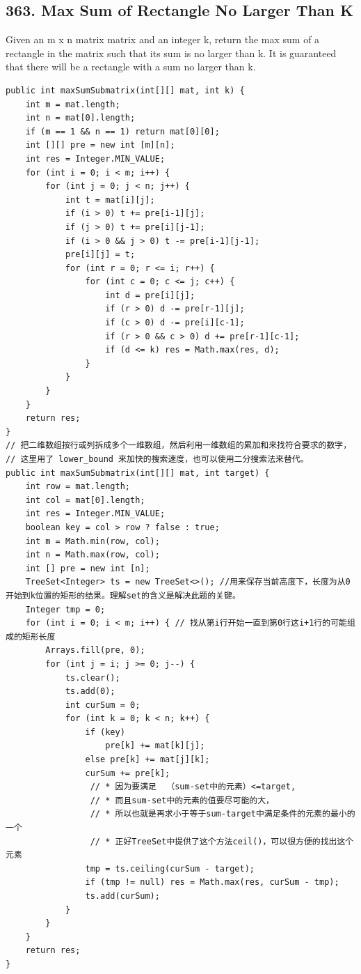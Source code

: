 \documentclass[9pt, b5paper]{article}
\begin{document}
\subsection{363. Max Sum of Rectangle No Larger Than K}
\label{sec-4-40}
Given an m x n matrix matrix and an integer k, return the max sum of a rectangle in the matrix such that its sum is no larger than k.
It is guaranteed that there will be a rectangle with a sum no larger than k.
\begin{verbatim}
public int maxSumSubmatrix(int[][] mat, int k) {
    int m = mat.length;
    int n = mat[0].length;
    if (m == 1 && n == 1) return mat[0][0];
    int [][] pre = new int [m][n];
    int res = Integer.MIN_VALUE;
    for (int i = 0; i < m; i++) {
        for (int j = 0; j < n; j++) {
            int t = mat[i][j];
            if (i > 0) t += pre[i-1][j];
            if (j > 0) t += pre[i][j-1];
            if (i > 0 && j > 0) t -= pre[i-1][j-1];
            pre[i][j] = t;
            for (int r = 0; r <= i; r++) {
                for (int c = 0; c <= j; c++) {
                    int d = pre[i][j];
                    if (r > 0) d -= pre[r-1][j];
                    if (c > 0) d -= pre[i][c-1];
                    if (r > 0 && c > 0) d += pre[r-1][c-1];
                    if (d <= k) res = Math.max(res, d);
                }
            }
        }
    }
    return res;
}
// 把二维数组按行或列拆成多个一维数组，然后利用一维数组的累加和来找符合要求的数字，
// 这里用了 lower_bound 来加快的搜索速度，也可以使用二分搜索法来替代。
public int maxSumSubmatrix(int[][] mat, int target) {
    int row = mat.length;
    int col = mat[0].length;
    int res = Integer.MIN_VALUE;
    boolean key = col > row ? false : true;
    int m = Math.min(row, col);
    int n = Math.max(row, col);
    int [] pre = new int [n];
    TreeSet<Integer> ts = new TreeSet<>(); //用来保存当前高度下，长度为从0开始到k位置的矩形的结果。理解set的含义是解决此题的关键。
    Integer tmp = 0;
    for (int i = 0; i < m; i++) { // 找从第i行开始一直到第0行这i+1行的可能组成的矩形长度
        Arrays.fill(pre, 0);
        for (int j = i; j >= 0; j--) {
            ts.clear();
            ts.add(0);
            int curSum = 0;
            for (int k = 0; k < n; k++) {
                if (key)
                    pre[k] += mat[k][j];
                else pre[k] += mat[j][k];
                curSum += pre[k];
                 // * 因为要满足  （sum-set中的元素）<=target,
                 // * 而且sum-set中的元素的值要尽可能的大，
                 // * 所以也就是再求小于等于sum-target中满足条件的元素的最小的一个
                 // * 正好TreeSet中提供了这个方法ceil()，可以很方便的找出这个元素
                tmp = ts.ceiling(curSum - target);
                if (tmp != null) res = Math.max(res, curSum - tmp);
                ts.add(curSum);
            }
        }
    }
    return res;
}
\end{verbatim}
\end{document}
